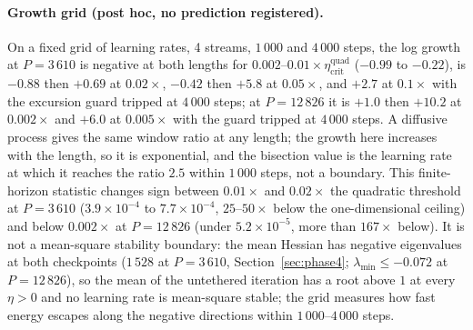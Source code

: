 \documentclass[11pt]{article}
\theoremstyle{remark}
\newcommand{\etacrit}{\eta_{\mathrm{crit}}}
\begin{document}
\paragraph{Growth grid (post hoc, no prediction registered).} On a fixed grid of learning rates, 4 streams, $1\,000$ and $4\,000$ steps, the log growth at $P=3\,610$ is negative at both lengths for $0.002$--$0.01\times\etacrit^{\mathrm{quad}}$ ($-0.99$ to $-0.22$), is $-0.88$ then $+0.69$ at $0.02\times$, $-0.42$ then $+5.8$ at $0.05\times$, and $+2.7$ at $0.1\times$ with the excursion guard tripped at $4\,000$ steps; at $P=12\,826$ it is $+1.0$ then $+10.2$ at $0.002\times$ and $+6.0$ at $0.005\times$ with the guard tripped at $4\,000$ steps. A diffusive process gives the same window ratio at any length; the growth here increases with the length, so it is exponential, and the bisection value is the learning rate at which it reaches the ratio $2.5$ within $1\,000$ steps, not a boundary. This finite-horizon statistic changes sign between $0.01\times$ and $0.02\times$ the quadratic threshold at $P=3\,610$ ($3.9\times10^{-4}$ to $7.7\times10^{-4}$, $25$--$50\times$ below the one-dimensional ceiling) and below $0.002\times$ at $P=12\,826$ (under $5.2\times10^{-5}$, more than $167\times$ below). It is not a mean-square stability boundary: the mean Hessian has negative eigenvalues at both checkpoints ($1\,528$ at $P=3\,610$, Section~\ref{sec:phase4}; $\lambda_{\min}\le-0.072$ at $P=12\,826$), so the mean of the untethered iteration has a root above $1$ at every $\eta>0$ and no learning rate is mean-square stable; the grid measures how fast energy escapes along the negative directions within $1\,000$--$4\,000$ steps.
\end{document}
